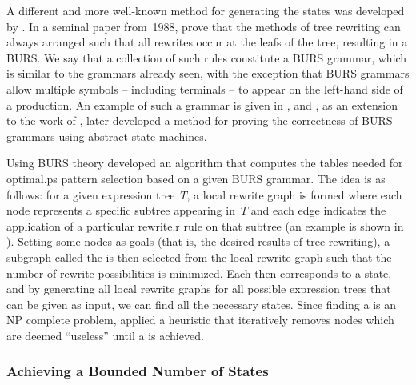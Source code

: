 {A different and more well-known method for generating the \glspl{state} was
developed by \textcite{Pelegri-Llopart1988}.
%
In a seminal paper from~1988,
\citeauthor{Pelegri-Llopart1988} prove that the methods of \gls{tree rewriting}
can always arranged such that all rewrites occur at the \glspl{leaf} of the
\gls{tree}, resulting in a \gls{BURS}.
%
We say that a collection of such
\glspl{rule} constitute a \gls{BURS grammar}, which is similar to the
\glspl{grammar} already seen, with the exception that \glspl{BURS grammar} allow
multiple \glspl{symbol} -- including \glspl{terminal} -- to appear on the
left-hand side of a \gls{production}.
%
An example of such a \gls{grammar} is
given in , and \textcite{Dold1998}, as
an extension to the work of \textcite{Zimmermann1997}, later developed a method
for proving the correctness of \glspl{BURS grammar} using abstract \glspl{state
  machine}.

Using \gls{BURS} theory \citeauthor{Pelegri-Llopart1988} developed an algorithm
that computes the tables needed for \gls{optimal.ps} \gls{pattern
  selection} based on a given \gls{BURS grammar}.
%
The idea is as follows: for a given \gls{expression tree}~$T$, a \gls{local
  rewrite graph} is formed where each \gls{node} represents a specific
\gls{subtree} appearing in~$T$ and each \gls{edge} indicates the application of
a particular \gls{rewrite.r} \gls{rule} on that \gls{subtree} (an example is
shown in ).
%
Setting some \glspl{node} as goals (that
is, the desired results of \gls{tree rewriting}), a subgraph called the
\tUILRgraph is then selected from the \gls{local rewrite graph} such that the
number of rewrite possibilities is minimized.
%
Each \tUILRgraph then corresponds
to a \gls{state}, and by generating all \glspl{local rewrite graph} for all
possible \glspl{expression tree} that can be given as input, we can find all the
necessary \glspl{state}.
%
Since finding a \tUILRgraph is an \gls{NP complete}
problem, \citeauthor{Pelegri-Llopart1988} applied a heuristic that iteratively
removes \glspl{node} which are deemed ``useless'' until a \tUILRgraph is
achieved.


\subsubsection{Achieving a Bounded Number of States}

}
